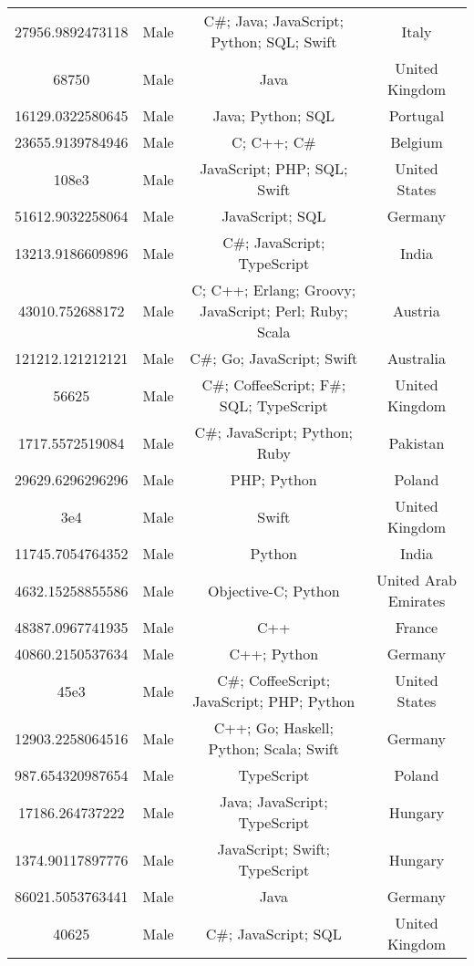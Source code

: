 \begin{center}
\begin{tabular}{ |c|c|c|c| }
27956.9892473118  &  Male  &  C\#; Java; JavaScript; Python; SQL; Swift  &  Italy  \\ 
68750  &  Male  &  Java  &  United Kingdom  \\ 
16129.0322580645  &  Male  &  Java; Python; SQL  &  Portugal  \\ 
23655.9139784946  &  Male  &  C; C++; C\#  &  Belgium  \\ 
108e3  &  Male  &  JavaScript; PHP; SQL; Swift  &  United States  \\ 
51612.9032258064  &  Male  &  JavaScript; SQL  &  Germany  \\ 
13213.9186609896  &  Male  &  C\#; JavaScript; TypeScript  &  India  \\ 
43010.752688172  &  Male  &  C; C++; Erlang; Groovy; JavaScript; Perl; Ruby; Scala  &  Austria  \\ 
121212.121212121  &  Male  &  C\#; Go; JavaScript; Swift  &  Australia  \\ 
56625  &  Male  &  C\#; CoffeeScript; F\#; SQL; TypeScript  &  United Kingdom  \\ 
1717.5572519084  &  Male  &  C\#; JavaScript; Python; Ruby  &  Pakistan  \\ 
29629.6296296296  &  Male  &  PHP; Python  &  Poland  \\ 
3e4  &  Male  &  Swift  &  United Kingdom  \\ 
11745.7054764352  &  Male  &  Python  &  India  \\ 
4632.15258855586  &  Male  &  Objective-C; Python  &  United Arab Emirates  \\ 
48387.0967741935  &  Male  &  C++  &  France  \\ 
40860.2150537634  &  Male  &  C++; Python  &  Germany  \\ 
45e3  &  Male  &  C\#; CoffeeScript; JavaScript; PHP; Python  &  United States  \\ 
12903.2258064516  &  Male  &  C++; Go; Haskell; Python; Scala; Swift  &  Germany  \\ 
987.654320987654  &  Male  &  TypeScript  &  Poland  \\ 
17186.264737222  &  Male  &  Java; JavaScript; TypeScript  &  Hungary  \\ 
1374.90117897776  &  Male  &  JavaScript; Swift; TypeScript  &  Hungary  \\ 
86021.5053763441  &  Male  &  Java  &  Germany  \\ 
40625  &  Male  &  C\#; JavaScript; SQL  &  United Kingdom  \\ 

\end{tabular}
\end{center}
